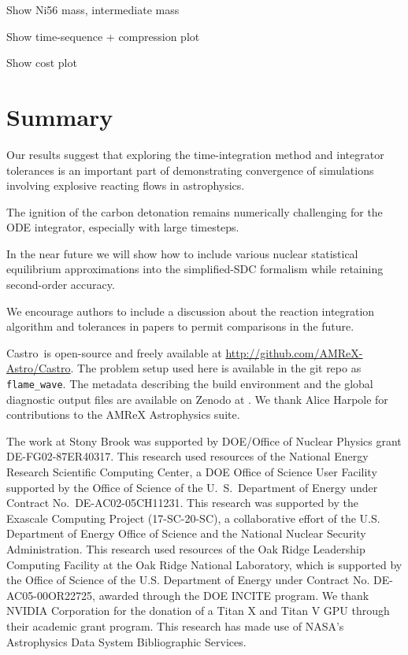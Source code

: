 \documentclass[linenumbers,trackchanges]{aastex631}
\newcommand{\castro}{{\sf Castro}}
\newcommand{\MarginPar}[1]{
    \marginpar{\vskip-\baselineskip%
               \raggedright%
               \tiny\sffamily%
               {\color{red}\hrule%
               \smallskip%
               #1\par%
               \smallskip%
               \hrule}}%
}
\begin{document}
Show Ni56 mass, intermediate mass

Show time-sequence + compression plot

Show cost plot

\section{Summary}

Our results suggest that exploring the time-integration method and
integrator tolerances is an important part of demonstrating
convergence of simulations involving explosive reacting flows in
astrophysics.

The ignition of the carbon detonation remains numerically challenging for the ODE integrator, especially with large timesteps.  \MarginPar{add some info on why it fails}
In the near future we will show how to include various nuclear
statistical equilibrium approximations into the simplified-SDC
formalism while retaining second-order accuracy.

We encourage authors to include a discussion about the reaction integration algorithm
and tolerances in papers to permit comparisons in the future.

\begin{acknowledgements}
\castro\ is open-source and freely available at
\url{http://github.com/AMReX-Astro/Castro}.  The problem setup used
here is available in the git repo as {\tt flame\_wave}. The metadata
describing the build environment and the global diagnostic output
files are available on Zenodo at \citet{xrb_data}.  We thank Alice
Harpole for contributions to the AMReX Astrophysics suite.

The work at Stony Brook was supported by DOE/Office of Nuclear
Physics grant DE-FG02-87ER40317.  This research used resources of the
National Energy Research Scientific Computing Center, a DOE Office of
Science User Facility supported by the Office of Science of the
U.~S.\ Department of Energy under Contract No.\ DE-AC02-05CH11231.
This research was supported by the Exascale Computing Project
(17-SC-20-SC), a collaborative effort of the U.S. Department of Energy
Office of Science and the National Nuclear Security Administration.
This research used resources of the Oak Ridge Leadership Computing
Facility at the Oak Ridge National Laboratory, which is supported by
the Office of Science of the U.S. Department of Energy under Contract
No. DE-AC05-00OR22725, awarded through the DOE INCITE program.  We
thank NVIDIA Corporation for the donation of a Titan X and Titan V GPU
through their academic grant program.  This research has made use of
NASA's Astrophysics Data System Bibliographic Services.
\end{acknowledgements}
\end{document}
